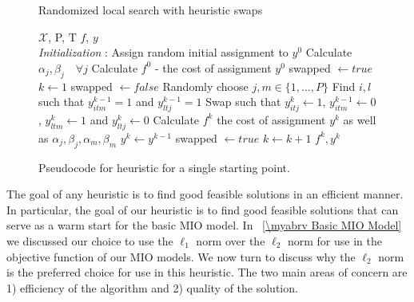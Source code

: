 \begin{figure}[ht] 
 \removelatexerror
\begin{algorithm}[H]
 \caption{Randomized local search with heuristic swaps}
 \label{alg:Basic_Heuristic}
 \begin{algorithmic}[1]
  \renewcommand{\algorithmicrequire}{\textbf{Input:}}
  \renewcommand{\algorithmicensure}{\textbf{Output:}}
 \REQUIRE $\boldsymbol{\mathcal{X}}$, P, T
 \ENSURE  $f$, $y$
 \\ \textit{Initialization} : Assign random initial assignment to $y^{0}$
  \STATE Calculate $\alpha_{j}, \beta_{j} \quad \forall j $
  \STATE Calculate $f^{0}$ - the cost of assignment $y^{0}$
  \STATE swapped $\leftarrow true$
  \STATE $k\leftarrow1$
  \STATE swapped $\leftarrow false$
  \STATE Randomly choose $j,m\in\{1,\ldots,P\}$
  \STATE Find $i,l$ such that $y^{k-1}_{itm}=1$ and $y^{k-1}_{ltj}=1$
  \STATE Swap such that $y^{k}_{itj}\leftarrow1$, $y^{k-1}_{itm}\leftarrow 0$, $y^{k}_{ltm}\leftarrow1$ and $y^{k}_{ltj}\leftarrow0$
  \STATE Calculate $f^{k}$ the cost of assignment $y^k$ as well as $\alpha_{j}, \beta_{j}, \alpha_{m}, \beta_{m}$
  \STATE $y^{k} \leftarrow y^{k-1}$
  \ELSE 
  \STATE swapped $\leftarrow true$
  \ENDIF
  \ENDFOR
  \STATE $ k \leftarrow k + 1 $
  \ENDWHILE
 \RETURN $f^{k}, y^{k}$ 
 \end{algorithmic} 
 \end{algorithm}
  \caption{Pseudocode for heuristic for a single starting point.}
  \label{fig:Basic_Heuristic}
 \end{figure}

The goal of any heuristic is to find good feasible solutions in an efficient manner. In particular, the goal of our heuristic is to find good feasible solutions that can serve as a warm start for the basic MIO model. In \mysection~\ref{\myabrv Basic MIO Model} we discussed our choice to use the $\ell_1$ norm over the $\ell_2$ norm for use in the objective function of our MIO models. We now turn to discuss why the $\ell_2$ norm is the preferred choice for use in this heuristic. The two main areas of concern are 1) efficiency of the algorithm and 2) quality of the solution.

